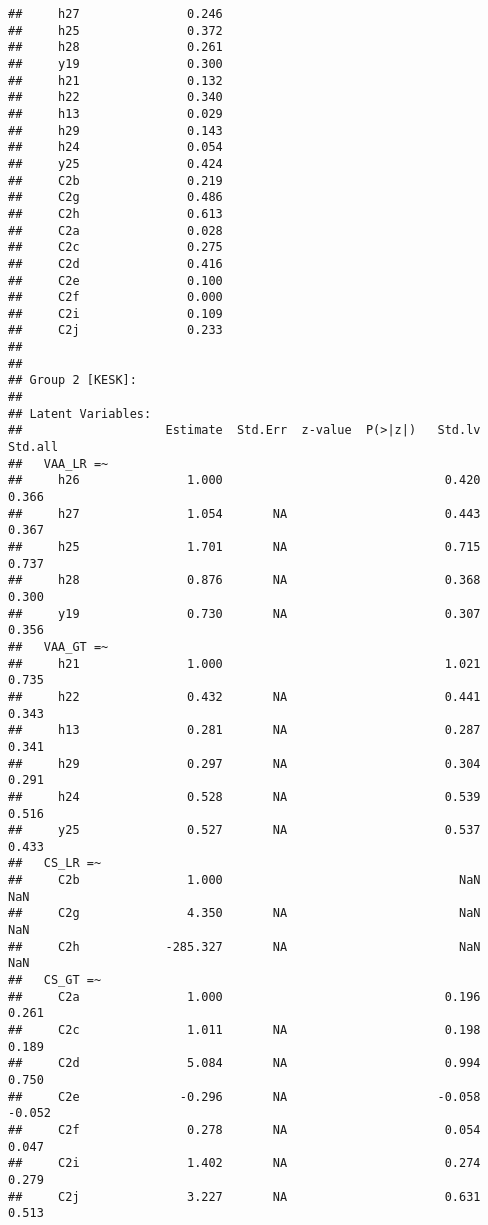 \documentclass[
]{article}
\begin{document}
\begin{verbatim}
##     h27               0.246
##     h25               0.372
##     h28               0.261
##     y19               0.300
##     h21               0.132
##     h22               0.340
##     h13               0.029
##     h29               0.143
##     h24               0.054
##     y25               0.424
##     C2b               0.219
##     C2g               0.486
##     C2h               0.613
##     C2a               0.028
##     C2c               0.275
##     C2d               0.416
##     C2e               0.100
##     C2f               0.000
##     C2i               0.109
##     C2j               0.233
## 
## 
## Group 2 [KESK]:
## 
## Latent Variables:
##                    Estimate  Std.Err  z-value  P(>|z|)   Std.lv  Std.all
##   VAA_LR =~                                                             
##     h26               1.000                               0.420    0.366
##     h27               1.054       NA                      0.443    0.367
##     h25               1.701       NA                      0.715    0.737
##     h28               0.876       NA                      0.368    0.300
##     y19               0.730       NA                      0.307    0.356
##   VAA_GT =~                                                             
##     h21               1.000                               1.021    0.735
##     h22               0.432       NA                      0.441    0.343
##     h13               0.281       NA                      0.287    0.341
##     h29               0.297       NA                      0.304    0.291
##     h24               0.528       NA                      0.539    0.516
##     y25               0.527       NA                      0.537    0.433
##   CS_LR =~                                                              
##     C2b               1.000                                 NaN      NaN
##     C2g               4.350       NA                        NaN      NaN
##     C2h            -285.327       NA                        NaN      NaN
##   CS_GT =~                                                              
##     C2a               1.000                               0.196    0.261
##     C2c               1.011       NA                      0.198    0.189
##     C2d               5.084       NA                      0.994    0.750
##     C2e              -0.296       NA                     -0.058   -0.052
##     C2f               0.278       NA                      0.054    0.047
##     C2i               1.402       NA                      0.274    0.279
##     C2j               3.227       NA                      0.631    0.513

\end{verbatim}
\end{document}
